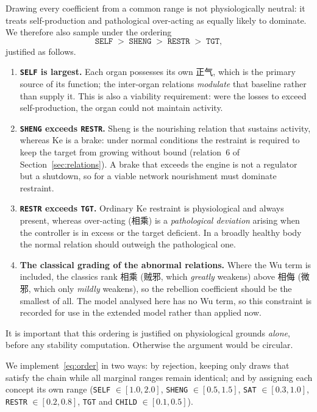 \documentclass[11pt]{article}
\begin{document}
Drawing every coefficient from a common range is not physiologically neutral: it
treats self-production and pathological over-acting as equally likely to
dominate. We therefore also sample under the ordering
\begin{equation}\label{eq:order}
\texttt{SELF} \;>\; \texttt{SHENG} \;>\; \texttt{RESTR} \;>\; \texttt{TGT},
\end{equation}
justified as follows.

\begin{enumerate}
\item \textbf{\texttt{SELF} is largest.} Each organ possesses its own 正气, which
is the primary source of its function; the inter-organ relations \emph{modulate}
that baseline rather than supply it. This is also a viability requirement: were
the losses to exceed self-production, the organ could not maintain activity.

\item \textbf{\texttt{SHENG} exceeds \texttt{RESTR}.} Sheng is the nourishing
relation that sustains activity, whereas Ke is a brake: under normal conditions
the restraint is required to keep the target from growing without bound
(relation~6 of Section~\ref{sec:relations}). A brake that exceeds the engine is
not a regulator but a shutdown, so for a viable network nourishment must dominate
restraint.

\item \textbf{\texttt{RESTR} exceeds \texttt{TGT}.} Ordinary Ke restraint is
physiological and always present, whereas over-acting (相乘) is a
\emph{pathological deviation} arising when the controller is in excess or the
target deficient. In a broadly healthy body the normal relation should outweigh
the pathological one.

\item \textbf{The classical grading of the abnormal relations.} Where the Wu term
is included, the classics rank 相乘 (贼邪, which \emph{greatly} weakens) above
相侮 (微邪, which only \emph{mildly} weakens), so the rebellion coefficient should
be the smallest of all. The model analysed here has no Wu term, so this
constraint is recorded for use in the extended model rather than applied now.
\end{enumerate}

It is important that this ordering is justified on physiological grounds
\emph{alone}, before any stability computation. Otherwise the argument would be
circular.

We implement~\eqref{eq:order} in two ways: by rejection, keeping only draws that
satisfy the chain while all marginal ranges remain identical; and by assigning
each concept its own range (\texttt{SELF} $\in[1.0,2.0]$, \texttt{SHENG}
$\in[0.5,1.5]$, \texttt{SAT} $\in[0.3,1.0]$, \texttt{RESTR} $\in[0.2,0.8]$,
\texttt{TGT} and \texttt{CHILD} $\in[0.1,0.5]$).
\end{document}
